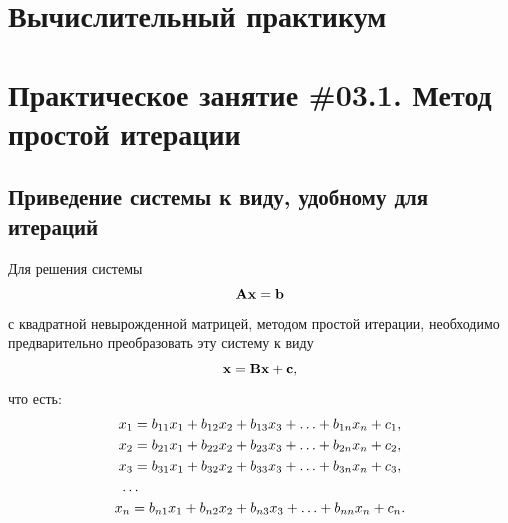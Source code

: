 \documentclass[12pt]{article}
\begin{document}
    \begin{flushright}
	\end{flushright}
	\begin{flushright}
	\end{flushright}
    \section*{Вычислительный практикум}
    \section*{Практическое занятие \#03.1. Метод простой итерации}

	\subsection*{Приведение системы к виду, удобному для итераций}
	
	Для решения системы
	\begin{equation}
		\bold{A}\bold{x}=\bold{b}\label{f1}
	\end{equation}
	с квадратной невырожденной матрицей, методом простой итерации, необходимо предварительно преобразовать эту систему к виду
	\begin{equation}
		\bold{x}=\bold{Bx}+\bold{c},\label{f2}
	\end{equation}
	что есть:
	\begin{equation}
		\begin{gathered}
			x_1=b_{11}x_{1}+b_{12}x_2+b_{13}x_3+\ldots+b_{1n}x_{n}+c_{1},\\
			x_2=b_{21}x_{1}+b_{22}x_2+b_{23}x_3+\ldots+b_{2n}x_{n}+c_{2},\\
			x_3=b_{31}x_{1}+b_{32}x_2+b_{33}x_3+\ldots+b_{3n}x_{n}+c_{3},\\
			\ldots\hspace{65mm}\\
			x_n=b_{n1}x_{1}+b_{n2}x_2+b_{n3}x_3+\ldots+b_{nn}x_{n}+c_{n}.\\
		\end{gathered}
	\end{equation}
	
\end{document}
